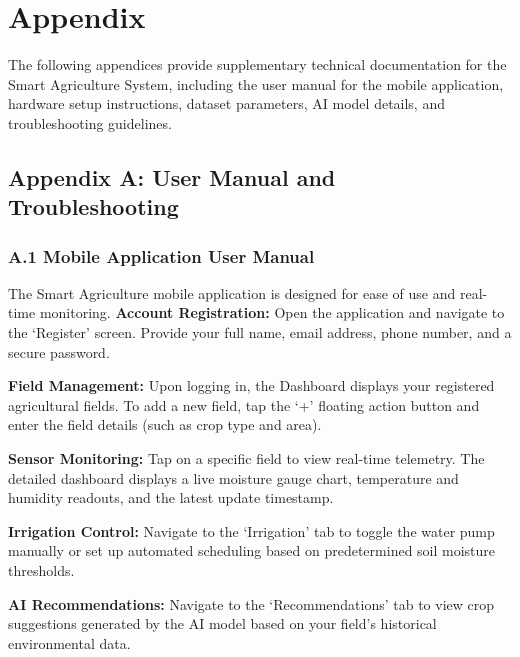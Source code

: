 
\chapter*{Appendix}

The following appendices provide supplementary technical documentation for the Smart Agriculture System, including the user manual for the mobile application, hardware setup instructions, dataset parameters, AI model details, and troubleshooting guidelines.


\section*{Appendix A: User Manual and Troubleshooting}

\subsection*{A.1 Mobile Application User Manual}
The Smart Agriculture mobile application is designed for ease of use and real-time monitoring. 
\textbf{Account Registration:} Open the application and navigate to the `Register' screen. Provide your full name, email address, phone number, and a secure password.

\textbf{Field Management:} Upon logging in, the Dashboard displays your registered agricultural fields. To add a new field, tap the `+' floating action button and enter the field details (such as crop type and area).

\textbf{Sensor Monitoring:} Tap on a specific field to view real-time telemetry. The detailed dashboard displays a live moisture gauge chart, temperature and humidity readouts, and the latest update timestamp.

\textbf{Irrigation Control:} Navigate to the `Irrigation' tab to toggle the water pump manually or set up automated scheduling based on predetermined soil moisture thresholds.

\textbf{AI Recommendations:} Navigate to the `Recommendations' tab to view crop suggestions generated by the AI model based on your field's historical environmental data.



